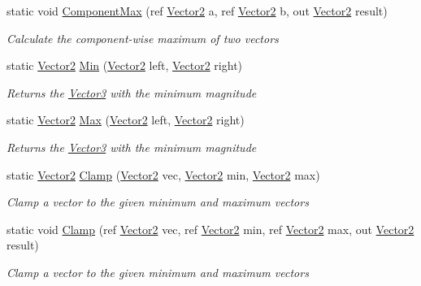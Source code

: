 \begin{DoxyCompactItemize}
static void \hyperlink{struct_open_t_k_1_1_vector2_af4b17308fb06244abb2fb547e6609b52}{Component\-Max} (ref \hyperlink{struct_open_t_k_1_1_vector2}{Vector2} a, ref \hyperlink{struct_open_t_k_1_1_vector2}{Vector2} b, out \hyperlink{struct_open_t_k_1_1_vector2}{Vector2} result)
\begin{DoxyCompactList}\small\item\em Calculate the component-\/wise maximum of two vectors \end{DoxyCompactList}\item 
static \hyperlink{struct_open_t_k_1_1_vector2}{Vector2} \hyperlink{struct_open_t_k_1_1_vector2_a8e023e23aa19f2bc5167758264124c61}{Min} (\hyperlink{struct_open_t_k_1_1_vector2}{Vector2} left, \hyperlink{struct_open_t_k_1_1_vector2}{Vector2} right)
\begin{DoxyCompactList}\small\item\em Returns the \hyperlink{struct_open_t_k_1_1_vector3}{Vector3} with the minimum magnitude \end{DoxyCompactList}\item 
static \hyperlink{struct_open_t_k_1_1_vector2}{Vector2} \hyperlink{struct_open_t_k_1_1_vector2_a439f757e01161e54e7f083e4b33047dc}{Max} (\hyperlink{struct_open_t_k_1_1_vector2}{Vector2} left, \hyperlink{struct_open_t_k_1_1_vector2}{Vector2} right)
\begin{DoxyCompactList}\small\item\em Returns the \hyperlink{struct_open_t_k_1_1_vector3}{Vector3} with the minimum magnitude \end{DoxyCompactList}\item 
static \hyperlink{struct_open_t_k_1_1_vector2}{Vector2} \hyperlink{struct_open_t_k_1_1_vector2_a22a277477ed0a0307a757d9a203c42f2}{Clamp} (\hyperlink{struct_open_t_k_1_1_vector2}{Vector2} vec, \hyperlink{struct_open_t_k_1_1_vector2}{Vector2} min, \hyperlink{struct_open_t_k_1_1_vector2}{Vector2} max)
\begin{DoxyCompactList}\small\item\em Clamp a vector to the given minimum and maximum vectors \end{DoxyCompactList}\item 
static void \hyperlink{struct_open_t_k_1_1_vector2_ac73faa891a15802b7b9d5208d20ca9b9}{Clamp} (ref \hyperlink{struct_open_t_k_1_1_vector2}{Vector2} vec, ref \hyperlink{struct_open_t_k_1_1_vector2}{Vector2} min, ref \hyperlink{struct_open_t_k_1_1_vector2}{Vector2} max, out \hyperlink{struct_open_t_k_1_1_vector2}{Vector2} result)
\begin{DoxyCompactList}\small\item\em Clamp a vector to the given minimum and maximum vectors \end{DoxyCompactList}\item 

\end{DoxyCompactItemize}

